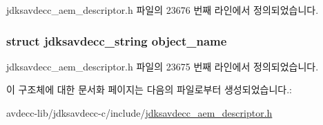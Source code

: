 jdksavdecc\+\_\+aem\+\_\+descriptor.\+h 파일의 23676 번째 라인에서 정의되었습니다.

\subsubsection[{\texorpdfstring{object\+\_\+name}{object_name}}]{\setlength{\rightskip}{0pt plus 5cm}struct {\bf jdksavdecc\+\_\+string} object\+\_\+name}\hypertarget{structjdksavdecc__descriptor__clock__domain_a7d1f5945a13863b1762fc6db74fa8f80}{}\label{structjdksavdecc__descriptor__clock__domain_a7d1f5945a13863b1762fc6db74fa8f80}


jdksavdecc\+\_\+aem\+\_\+descriptor.\+h 파일의 23675 번째 라인에서 정의되었습니다.



이 구조체에 대한 문서화 페이지는 다음의 파일로부터 생성되었습니다.\+:\begin{DoxyCompactItemize}
\item 
avdecc-\/lib/jdksavdecc-\/c/include/\hyperlink{jdksavdecc__aem__descriptor_8h}{jdksavdecc\+\_\+aem\+\_\+descriptor.\+h}\end{DoxyCompactItemize}
